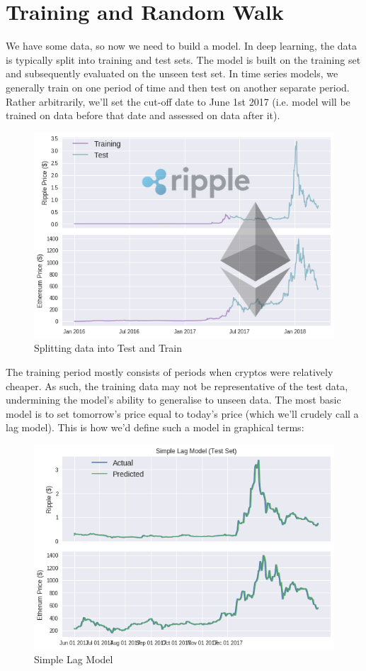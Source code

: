 \section{Training and Random Walk}

We have some data, so now we need to build a model. In deep learning, the data is typically split into training and test sets. The model is built on the training set and subsequently evaluated on the unseen test set. In time series models, we generally train on one period of time and then test on another separate period. Rather arbitrarily, we'll set the cut-off date to June 1st 2017 (i.e. model will be trained on data before that date and assessed on data after it).

\begin{figure}[h]
    \centering \includegraphics[scale=0.5]{images/training.png}
    \caption{Splitting data into Test and Train}
\end{figure}


The training period mostly consists of periods when cryptos were relatively cheaper. As such, the training data may not be representative of the test data, undermining the model's ability to generalise to unseen data. The most basic model is to set tomorrow's price equal to today's price (which we'll crudely call a lag model). This is how we'd define such a model in graphical terms:

\begin{figure}[h]
    \centering \includegraphics[scale=0.5]{images/lag.png}
    \caption{Simple Lag Model}
\end{figure}

